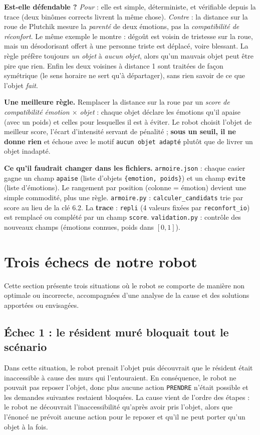 \documentclass[11pt,a4paper]{article}
\newcommand{\code}[1]{\texttt{#1}}
\newcommand{\cle}[1]{\textbf{#1}}
\begin{document}
\textbf{Est-elle défendable ?} \emph{Pour} : elle est simple, déterministe, et vérifiable depuis la trace (deux binômes corrects livrent la même chose). \emph{Contre} : la distance sur la roue de Plutchik mesure la \emph{parenté} de deux émotions, pas la \emph{compatibilité de réconfort}. Le même exemple le montre : dégoût est voisin de tristesse sur la roue, mais un désodorisant offert à une personne triste est déplacé, voire blessant. La règle préfère toujours \emph{un objet} à \emph{aucun objet}, alors qu'un mauvais objet peut être pire que rien. Enfin les deux voisines à distance 1 sont traitées de façon symétrique (le sens horaire ne sert qu'à départager), sans rien savoir de ce que l'objet \emph{fait}.

\textbf{Une meilleure règle.} Remplacer la distance sur la roue par un \emph{score de compatibilité émotion $\times$ objet} : chaque objet déclare les émotions qu'il apaise (avec un poids) et celles pour lesquelles il est à éviter. Le robot choisit l'objet de meilleur score, l'écart d'intensité servant de pénalité ; \cle{sous un seuil, il ne donne rien} et échoue avec le motif \code{aucun objet adapté} plutôt que de livrer un objet inadapté.

\textbf{Ce qu'il faudrait changer dans les fichiers.} \code{armoire.json} : chaque casier gagne un champ \code{apaise} (liste d'objets \code{\{emotion, poids\}}) et un champ \code{evite} (liste d'émotions). Le rangement par position (colonne = émotion) devient une simple commodité, plus une règle. \code{armoire.py} : \code{calculer\_candidats} trie par score au lieu de la clé 6.2. La \cle{trace} : \code{repli} (4 valeurs fixées par \code{reconfort\_io}) est remplacé ou complété par un champ \code{score}. \code{validation.py} : contrôle des nouveaux champs (émotions connues, poids dans $[0,1]$).

\newpage
\section{Trois échecs de notre robot}
Cette section présente trois situations où le robot se comporte de manière non optimale ou incorrecte, accompagnées d'une analyse de la cause et des solutions apportées ou envisagées.

\subsection{Échec 1 : le résident muré bloquait tout le scénario}
Dans cette situation, le robot prenait l'objet puis découvrait que le résident était inaccessible à cause des murs qui l'entouraient. En conséquence, le robot ne pouvait pas reposer l'objet, donc plus aucune action \texttt{PRENDRE} n'était possible et les demandes suivantes restaient bloquées. La cause vient de l'ordre des étapes : le robot ne découvrait l'inaccessibilité qu'après avoir pris l'objet, alors que l'énoncé ne prévoit aucune action pour le reposer et qu'il ne peut porter qu'un objet à la fois.
\end{document}
